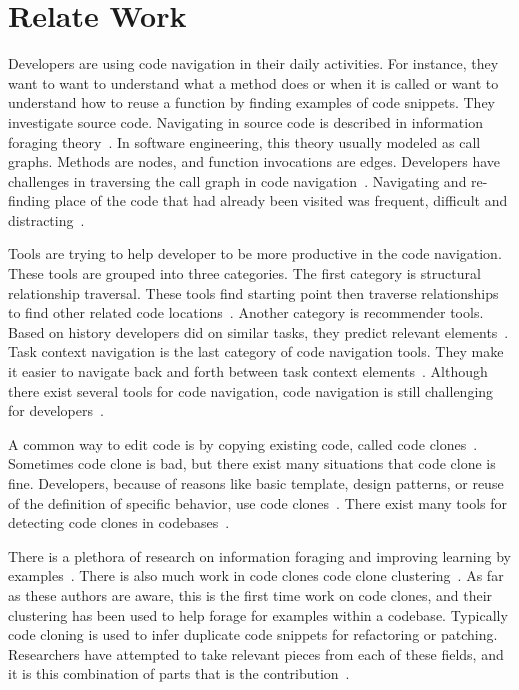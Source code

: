 \documentclass[conference]{IEEEtran}
\begin{document}
\section{Relate Work}
Developers are using code navigation in their daily activities. For instance, they want to want to understand what a method does or when it is called or want to understand how to reuse a function by finding examples of code snippets. They investigate source code. Navigating in source code is described in information foraging theory~\cite{pirolli1999informationforaging}. In software engineering, this theory usually modeled as call graphs. Methods are nodes, and function invocations are edges. Developers have challenges in traversing the call graph in code navigation~\cite{albusays2017interviews}. Navigating and re-finding place of the code that had already been visited was frequent, difficult and distracting~\cite{ko2005eliciting,deline2005towards}.\par 

Tools are trying to help developer to be more productive in the code navigation. These tools are grouped into three categories. The first category is structural relationship traversal. These tools find starting point then traverse relationships to find other related code locations~\cite{karrer2011stacksplorer,augustine2015field,latoza2011visualizing}. Another category is recommender tools. Based on history developers did on similar tasks, they predict relevant elements~\cite{zimmermann2005mining,deline2005easing}. Task context navigation is the last category of code navigation tools. They make it easier to navigate back and forth between task context elements~\cite{ko2006exploratory}. Although there exist several tools for code navigation, code navigation is still challenging for developers~\cite{albusays2017interviews}. 

A common way to edit code is by copying existing code, called code clones~\cite{codeCloneDetection2019}. Sometimes code clone is bad, but there exist many situations that code clone is fine. Developers, because of reasons like basic template, design patterns, or reuse of the definition of specific behavior, use code clones~\cite{kim2004ethnographic,kapser2008cloning}. There exist many tools for detecting code clones in codebases~\cite{bellon2007comparison}.\par 

There is a plethora of research on information foraging and improving learning by examples~\cite{brandt2009two}. There is also much work in code clones code clone clustering~\cite{codeCloneDetection2019}. As far as these authors are aware, this is the first time work on code clones, and their clustering has been used to help forage for examples within a codebase. Typically code cloning is used to infer duplicate code snippets for refactoring or patching. Researchers have attempted to take relevant pieces from each of these fields, and it is this combination of parts that is the contribution~\cite{kapser2009toward}.\par
\end{document}
